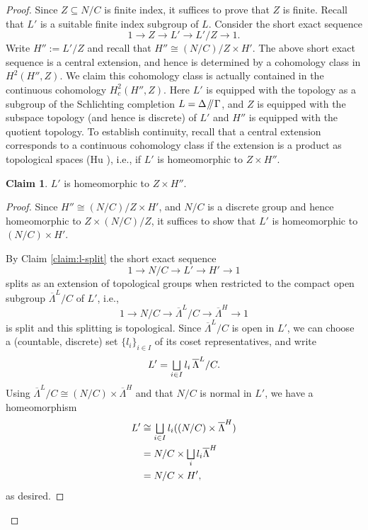 \documentclass[11pt]{article}
\newcommand{\ie}{i.e.,\xspace}
\numberwithin{equation}{section}\providecommand{\llangle}{\langle\!\langle}\providecommand{\rrangle}{\rangle\!\rangle}\providecommand{\Asterisk}{\ast}
\let\oldbigsqcup\bigsqcup
\renewcommand{\bigsqcup}{\mathop{\textstyle\oldbigsqcup}\displaylimits}
\newcommand{\sslash}{\mathbin{\mkern-3mu /\mkern-5mu/ \mkern-3mu}}
\theoremstyle{definition}
\newtheorem{claim}[thm]{Claim}
\begin{document}
\begin{proof} Since $Z\subseteq N/C$ is finite index, it suffices to prove that $Z$ is finite. Recall that $L'$ is a suitable finite index subgroup of $L$. Consider the short exact sequence
\begin{equation}\label{eq:ses-z}
1\to Z\to L'\to L'/Z\to 1.
\end{equation}
Write $H'':=L'/Z$ and recall that $H''\cong (N/C)/Z\times H'$. The above short exact sequence is a central extension, and hence is determined by a cohomology class in $H^2(H'',Z)$. We claim this cohomology class is actually contained in the continuous cohomology $H^2_c(H'',Z)$. Here $L'$ is equipped with the topology as a subgroup of the Schlichting completion $L=\Delta\sslash\Gamma$, and $Z$ is equipped with the subspace topology (and hence is discrete) of $L'$ and $H''$ is equipped with the quotient topology. To establish continuity, recall that a central extension corresponds to a continuous cohomology class if the extension is a product as topological spaces (Hu \cite[5.3]{Hu-cohomology}), \ie if $L'$ is homeomorphic to $Z \times H''$.
\begin{claim}\label{claim:top-split}
$L'$ is homeomorphic to $Z\times H''$.
\end{claim}
\begin{proof} Since $H''\cong (N/C)/Z\times H'$, and $N/C$ is a discrete group and hence homeomorphic to $Z\times (N/C)/Z$, it suffices to show that $L'$ is homeomorphic to $(N/C)\times H'$.

By Claim \ref{claim:l-split} the short exact sequence
\[
1\to N/C\to L'\to H'\to 1
\]
splits as an extension of topological groups when restricted to the compact open subgroup $\overline{\Lambda}^L/C$ of $L'$, \ie
\[
1\to N/C\to \overline{\Lambda}^L/C\to \overline{\Lambda}^H\to 1
\]
is split and this splitting is topological. Since $\overline{\Lambda}^L/C$ is open in $L'$, we can choose a (countable, discrete) set $\{l_i\}_{i\in I}$ of its coset representatives, and write
\[
L'=\bigsqcup_{i\in I} l_i \, \overline{\Lambda}^L/C.
\]
Using $\overline{\Lambda}^L/C\cong (N/C)\times \overline{\Lambda}^H$ and that $N/C$ is normal in $L'$, we have a homeomorphism
\begin{align*}
L' &\cong \bigsqcup_{i\in I} l_i ((N/C)\times \overline{\Lambda}^H) \\
&= N/C\times \bigsqcup_i l_i \overline{\Lambda}^H \\
&=N/C \times H',
\end{align*}
as desired.\end{proof}


\end{proof}
\end{document}
